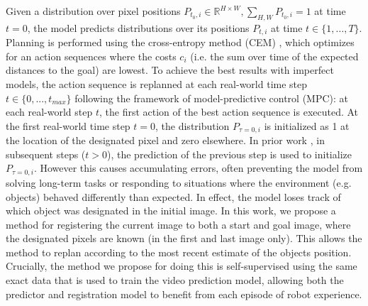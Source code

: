 Given a distribution over pixel positions \mbox{$P_{t_0,i}\in\mathbb{R}^{H\times W}, \sum_{H,W} P_{t_0,i} = 1$} at time $t = 0$, the model predicts distributions over its positions $P_{t,i}$ at time $t \in \{ 1, \dots, T \}$. Planning is performed using the cross-entropy method (CEM) \cite{cem-rk-13}, which optimizes for an action sequences where the costs $c_i$ (i.e. the sum over time of the expected distances to the goal) are lowest.
To achieve the best results with imperfect models, the action sequence is replanned at each real-world time step $t \in \{0,...,t_{max}\}$ following the framework of model-predictive control (MPC): at each real-world step $t$, the first action of the best action sequence is executed. 
At the first real-world time step $t=0$, the distribution $P_{\tau=0,i}$ is initialized as 1 at the location of the designated pixel and zero elsewhere. In prior work \cite{sna, foresight}, in subsequent steps ($t > 0$),  the prediction of the previous step is used to initialize $P_{\tau=0,i}$. However this causes accumulating errors, often preventing the model from solving long-term tasks or responding to situations where the environment (e.g. objects) behaved differently than expected. In effect, the model loses track of which object was designated in the initial image. In this work, we propose a method for registering the current image to both a start and goal image, where the designated pixels are known (in the first and last image only). This allows the method to replan according to the most recent estimate of the objects position. Crucially, the method we propose for doing this is self-supervised using the same exact data that is used to train the video prediction model, allowing both the predictor and registration model to benefit from each episode of robot experience.




